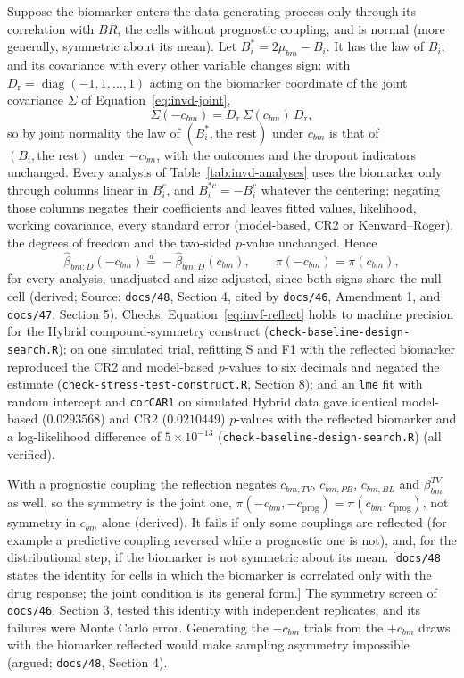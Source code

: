 \documentclass[11pt]{article}
\newcommand{\note}[1]{\textcolor{blue!60!black}{\small [#1]}}
\newcommand{\code}[1]{\texttt{#1}}
\begin{document}
Suppose the biomarker enters the data-generating process only through
its correlation with $BR$, the cells without prognostic coupling, and
is normal (more generally, symmetric about its mean). Let
$B^{\ast}_i = 2\mu_{bm} - B_i$. It has the law of $B_i$, and its
covariance with every other variable changes sign: with
$D_{\mathrm r} = \operatorname{diag}(-1, 1, \dots, 1)$ acting on the
biomarker coordinate of the joint covariance $\Sigma$ of
Equation~\eqref{eq:invd-joint},
\begin{equation}
\Sigma(-c_{bm}) = D_{\mathrm r}\,\Sigma(c_{bm})\,D_{\mathrm r},
\label{eq:invf-reflect}
\end{equation}
so by joint normality the law of $(B^{\ast}_i, \text{the rest})$ under
$c_{bm}$ is that of $(B_i, \text{the rest})$ under $-c_{bm}$, with the
outcomes and the dropout indicators unchanged. Every analysis of
Table~\ref{tab:invd-analyses} uses the biomarker only through columns
linear in $B^{c}_i$, and $B^{\ast c}_i = -B^{c}_i$ whatever the
centering; negating those columns negates their coefficients and
leaves fitted values, likelihood, working covariance, every standard
error (model-based, CR2 or Kenward--Roger), the degrees of freedom and
the two-sided $p$-value unchanged. Hence
\begin{equation}
\hat\beta_{bm:D}(-c_{bm}) \overset{d}{=} -\hat\beta_{bm:D}(c_{bm}),
\qquad \pi(-c_{bm}) = \pi(c_{bm}),
\label{eq:invd-symmetry}
\end{equation}
for every analysis, unadjusted and size-adjusted, since both signs share
the null cell (derived; Source: \code{docs/48}, Section 4, cited by
\code{docs/46}, Amendment 1, and \code{docs/47}, Section 5). Checks:
Equation~\eqref{eq:invf-reflect} holds to machine precision for the
Hybrid compound-symmetry construct (\code{check-baseline-design-search.R}); on one
simulated trial, refitting S and F1 with the reflected biomarker
reproduced the CR2 and model-based $p$-values to six decimals and
negated the estimate (\code{check-stress-test-construct.R}, Section 8); and an
\code{lme} fit with random intercept and \code{corCAR1} on simulated
Hybrid data gave identical model-based ($0.0293568$) and CR2
($0.0210449$) $p$-values with the reflected biomarker and a
log-likelihood difference of $5\times10^{-13}$ (\code{check-baseline-design-search.R})
(all verified).

With a prognostic coupling the reflection negates $c_{bm,TV}$,
$c_{bm,PB}$, $c_{bm,BL}$ and $\beta^{TV}_{bm}$ as well, so the symmetry
is the joint one,
$\pi(-c_{bm}, -c_{\mathrm{prog}}) = \pi(c_{bm}, c_{\mathrm{prog}})$,
not symmetry in $c_{bm}$ alone (derived). It fails if only some
couplings are reflected (for example a predictive coupling reversed
while a prognostic one is not), and, for the distributional step, if
the biomarker is not symmetric about its mean. \note{\code{docs/48}
states the identity for cells in which the biomarker is correlated only
with the drug response; the joint condition is its general form.} The
symmetry screen of \code{docs/46}, Section 3, tested this identity with
independent replicates, and its failures were Monte Carlo error.
Generating the $-c_{bm}$ trials from the $+c_{bm}$ draws with the
biomarker reflected would make sampling asymmetry impossible (argued;
\code{docs/48}, Section 4).
\end{document}
